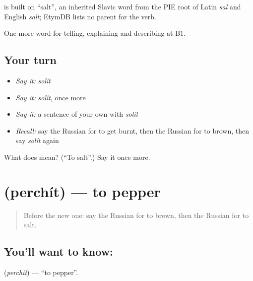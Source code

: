 \begin{cousinweb}
\emph{} is built on \emph{} \textquotedblleft{}salt\textquotedblright{}, an inherited Slavic word from the PIE root of Latin \emph{sal} and English \emph{salt}; EtymDB lists no parent for the verb.
\end{cousinweb}

\begin{grammarlens}[title={What you've built}]
One more word for telling, explaining and describing at B1.
\end{grammarlens}

\subsection*{Your turn}
\begin{itemize}
\raggedright
  \item \emph{Say it:} \emph{solít}
  \item \emph{Say it:} \emph{solít}, once more
  \item \emph{Say it:} a sentence of your own with \emph{solít}
  \item \emph{Recall:} say the Russian for to get burnt, then the Russian for to brown, then say \emph{solít} again
\end{itemize}

\begin{tcolorbox}[breakable,colback=teal!4,colframe=teal!35!black,title={Before you move on}]
What does  mean? (\textquotedblleft{}To salt\textquotedblright{}.) Say it once more.
\end{tcolorbox}
\section[\texorpdfstring{\ru{перчить} (perchít)}{перчить (perchít)}]{ (perchít) — to pepper}

\label{lesson:RU-C333-perchit}



\begin{quote}
Before the new one: say the Russian for to brown, then the Russian for to salt.
\end{quote}

\subsection*{You'll want to know: }
\textbf{} (\emph{perchít}) — \textquotedblleft{}to pepper\textquotedblright{}.


